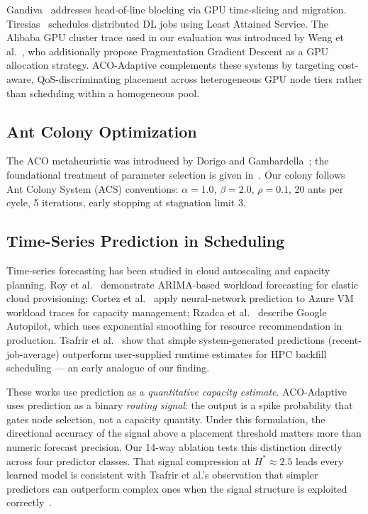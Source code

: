 \documentclass[conference]{IEEEtran}
\begin{document}
Gandiva~\cite{xiao2018gandiva} addresses head-of-line blocking via GPU
time-slicing and migration. Tiresias~\cite{gu2019tiresias} schedules
distributed DL jobs using Least Attained Service. The Alibaba GPU cluster
trace used in our evaluation was introduced by Weng et
al.~\cite{weng2023beware}, who additionally propose Fragmentation Gradient
Descent as a GPU allocation strategy. ACO-Adaptive complements these
systems by targeting cost-aware, QoS-discriminating placement across
heterogeneous GPU node tiers rather than scheduling within a homogeneous
pool.

\subsection{Ant Colony Optimization}

The ACO metaheuristic was introduced by Dorigo and
Gambardella~\cite{dorigo1997ant}; the foundational treatment of parameter
selection is given in~\cite{dorigo2004aco}. Our colony follows Ant Colony
System (ACS) conventions: $\alpha{=}1.0$, $\beta{=}2.0$, $\rho{=}0.1$,
20 ants per cycle, 5 iterations, early stopping at stagnation limit 3.

\subsection{Time-Series Prediction in Scheduling}

Time-series forecasting has been studied in cloud autoscaling and capacity
planning. Roy et al.~\cite{roy2011autoscaling} demonstrate ARIMA-based
workload forecasting for elastic cloud provisioning; Cortez et
al.~\cite{cortez2017resource} apply neural-network prediction to
Azure VM workload traces for capacity management; Rzadca et
al.~\cite{rzadca2020autopilot} describe Google Autopilot, which uses
exponential smoothing for resource recommendation in production.
Tsafrir et al.~\cite{tsafrir2007backfill} show that simple system-generated
predictions (recent-job-average) outperform user-supplied runtime estimates
for HPC backfill scheduling --- an early analogue of our finding.

These works use prediction as a \emph{quantitative capacity estimate}.
ACO-Adaptive uses prediction as a binary \emph{routing signal}: the output
is a spike probability that gates node selection, not a capacity quantity.
Under this formulation, the directional accuracy of the signal above a
placement threshold matters more than numeric forecast precision. Our 14-way
ablation tests this distinction directly across four predictor classes.
That signal compression at $H^{*}{\approx}2.5$ leads every learned model
is consistent with Tsafrir et al.'s observation that simpler predictors
can outperform complex ones when the signal structure is exploited
correctly~\cite{tsafrir2007backfill}.
\end{document}
